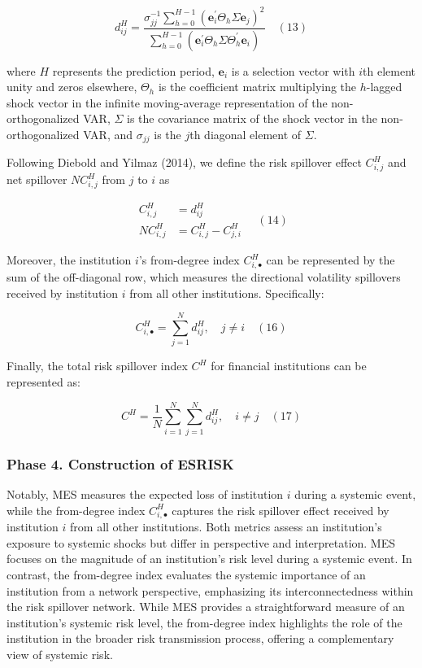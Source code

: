 \documentclass[12pt,a4paper]{article}
\begin{document}
    \[
    d_{ij}^{H} = \frac{\sigma_{jj}^{-1}\sum_{h=0}^{H-1}(\mathbf{e}_i^{\prime}\Theta_h\Sigma\mathbf{e}_j)^2}{\sum_{h=0}^{H-1}(\mathbf{e}_i^{\prime}\Theta_h\Sigma\Theta_h^{\prime}\mathbf{e}_i)} \quad (13)
    \]

    where $H$ represents the prediction period, $\mathbf{e}_i$ is a selection vector with $i$th element unity and zeros elsewhere, $\Theta_h$ is the coefficient matrix multiplying the $h$-lagged shock vector in the infinite moving-average representation of the non-orthogonalized VAR, $\Sigma$ is the covariance matrix of the shock vector in the non-orthogonalized VAR, and $\sigma_{jj}$ is the $j$th diagonal element of $\Sigma$.

    Following Diebold and Yilmaz (2014), we define the risk spillover effect $C_{i,j}^{H}$ and net spillover $NC_{i,j}^{H}$ from $j$ to $i$ as

    \[
    \begin{aligned}
    C_{i,j}^{H} &= d_{ij}^{H} \\
    NC_{i,j}^{H} &= C_{i,j}^{H} - C_{j,i}^{H}
    \end{aligned} \quad (14)
    \]

    Moreover, the institution $i$'s from-degree index $C_{i,\bullet}^{H}$ can be represented by the sum of the off-diagonal row, which measures the directional volatility spillovers received by institution $i$ from all other institutions. Specifically:

    \[
    C_{i,\bullet}^{H} = \sum_{j=1}^{N} d_{ij}^{H}, \quad j\neq i \quad (16)
    \]

    Finally, the total risk spillover index $C^{H}$ for financial institutions can be represented as:

    \[
    C^{H} = \frac{1}{N}\sum_{i=1}^{N}\sum_{j=1}^{N} d_{ij}^{H}, \quad i\neq j \quad (17)
    \]

    \subsubsection{Phase 4. Construction of ESRISK}

    Notably, MES measures the expected loss of institution $i$ during a systemic event, while the from-degree index $C_{i,\bullet}^{H}$ captures the risk spillover effect received by institution $i$ from all other institutions. Both metrics assess an institution's exposure to systemic shocks but differ in perspective and interpretation. MES focuses on the magnitude of an institution's risk level during a systemic event. In contrast, the from-degree index evaluates the systemic importance of an institution from a network perspective, emphasizing its interconnectedness within the risk spillover network. While MES provides a straightforward measure of an institution's systemic risk level, the from-degree index highlights the role of the institution in the broader risk transmission process, offering a complementary view of systemic risk.
\end{document}
